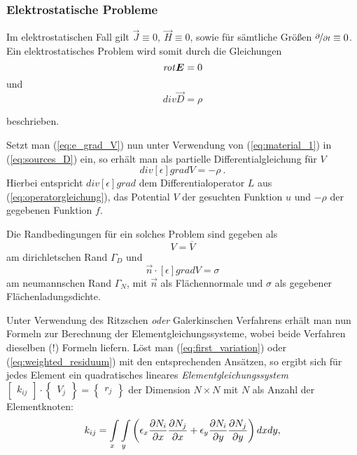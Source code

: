\subsubsection{Elektrostatische Probleme}
\label{sec:electrostatic_problems}
Im elektrostatischen Fall gilt $\vec{J} \equiv 0,\ \vec{H} \equiv 0$, sowie für sämtliche Größen $\nicefrac{\partial}{\partial t}\equiv 0$.
Ein elektrostatisches Problem wird somit durch die Gleichungen
\begin{equation}
\mathit{rot}\vec{E} = 0 \label{eq:wirbelfreiheit_E}\\
\end{equation}
und
\begin{equation}
\mathit{div}\vec{D} = \rho \label{eq:sources_D}
\end{equation}

beschrieben.\newline

Setzt man (\ref{eq:e_grad_V}) nun unter Verwendung von (\ref{eq:material_1}) in (\ref{eq:sources_D}) ein, so erhält man als partielle Differentialgleichung für $V$ 
\begin{equation}
\mathit{div}[\epsilon]\mathit{grad}V = -\rho \ .
\end{equation}
Hierbei entspricht $\mathit{div}[\epsilon]\mathit{grad}$ dem Differentialoperator $L$ aus (\ref{eq:operatorgleichung}), das Potential $V$ der gesuchten Funktion $u$ und $-\rho$ der gegebenen Funktion $f$.\newline

Die Randbedingungen für ein solches Problem sind gegeben als
\begin{equation}
\label{eq:e-static_dirichlet_condition}
	V = \overline{V}
\end{equation}
am dirichletschen Rand $\Gamma_D$ und 
\begin{equation}
\label{eq:e-static_neumann_condition}
\vec{n}\cdot[\epsilon]\mathit{grad}V = \sigma 
\end{equation}
am neumannschen Rand $\Gamma_N$, mit $\vec{n}$ als Flächennormale und $\sigma$ als gegebener Flächenladungsdichte.\newline

Unter Verwendung des Ritzschen \textit{oder} Galerkinschen Verfahrens erhält man nun Formeln zur Berechnung der Elementgleichungssysteme, wobei beide Verfahren dieselben (!) Formeln liefern. Löst man (\ref{eq:first_variation}) oder (\ref{eq:weighted_residuum}) mit den entsprechenden Ansätzen, so ergibt sich für jedes Element ein quadratisches lineares \textit{Elementgleichungssystem} $\begin{bmatrix}k_{ij}\end{bmatrix} \cdot \begin{Bmatrix}V_j\end{Bmatrix} = \begin{Bmatrix}r_j\end{Bmatrix}$ der Dimension $N\times N$ mit $N$ als Anzahl der Elementknoten:
\begin{equation}
\label{eq:k_ij_e_static}
k_{ij} = \int\displaylimits_{x} \int\displaylimits_{y} \left(\epsilon_x \parDiff{N_i}{x}\parDiff{N_j}{x} +  \epsilon_y\parDiff{N_i}{y}\parDiff{N_j}{y}\right)dx dy,
\end{equation}


